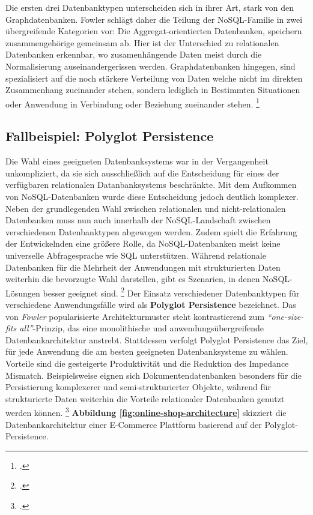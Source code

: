 Die ersten drei Datenbanktypen unterscheiden sich in ihrer Art, stark von den Graphdatenbanken. Fowler schlägt daher die Teilung der NoSQL-Familie  in zwei übergreifende Kategorien vor: Die Aggregat-orientierten Datenbanken, speichern zusammengehörige gemeinsam ab. Hier ist der Unterschied zu relationalen Datenbanken erkennbar, wo zusamenhängende Daten meist durch die Normalisierung auseinandergerissen werden. Graphdatenbanken hingegen, sind spezialisiert auf die noch stärkere Verteilung von Daten welche nicht im direkten Zusammenhang zueinander stehen, sondern lediglich in Bestimmten Situationen oder Anwendung in Verbindung oder Beziehung zueinander stehen. \footcite{fowlerAggregateOrientedDatabase2012}

\subsection{Fallbeispiel: Polyglot Persistence}

Die Wahl eines geeigneten Datenbanksystems war in der Vergangenheit unkompliziert, da sie sich ausschließlich auf die Entscheidung für eines der verfügbaren relationalen Datanbanksystems beschränkte. Mit dem Aufkommen von NoSQL-Datenbanken wurde diese Entscheidung jedoch deutlich komplexer. Neben der grundlegenden Wahl zwischen relationalen und nicht-relationalen Datenbanken muss nun auch innerhalb der NoSQL-Landschaft zwischen verschiedenen Datenbanktypen abgewogen werden. Zudem spielt die Erfahrung der Entwickelnden eine größere Rolle, da NoSQL-Datenbanken meist keine universelle Abfragesprache wie SQL unterstützen. Während relationale Datenbanken für die Mehrheit der Anwendungen mit strukturierten Daten weiterhin die bevorzugte Wahl darstellen, gibt es Szenarien, in denen NoSQL-Lösungen besser geeignet sind. \footcite[S. 194]{harrisonNextGenerationDatabases2015} Der Einsatz verschiedener Datenbanktypen für verschiedene Anwendungsfälle wird als \textbf{Polyglot Persistence} bezeichnet. Das von \textit{Fowler} popularisierte Architekturmuster steht kontrastierend zum \textit{\enquote{one-size-fits all}}-Prinzip, das eine monolithische und anwendungsübergreifende Datenbankarchitektur anstrebt. Stattdessen verfolgt Polyglot Persistence das Ziel, für jede Anwendung die am besten geeigneten Datenbanksysteme zu wählen. Vorteile sind die gesteigerte Produktivität und die Reduktion des Impedance Mismatch. Beispielsweise eignen sich Dokumentendatenbanken besonders für die Persistierung komplexerer und semi-strukturierter Objekte, während für strukturierte Daten weiterhin die Vorteile relationaler Datenbanken genutzt werden können. \footcite[S. 1 f.]{gessertPolyglotPersistence2015} \textbf{Abbildung \ref{fig:online-shop-architecture}} skizziert die Datenbankarchitektur einer E-Commerce Plattform basierend auf der Polyglot-Persistence.

